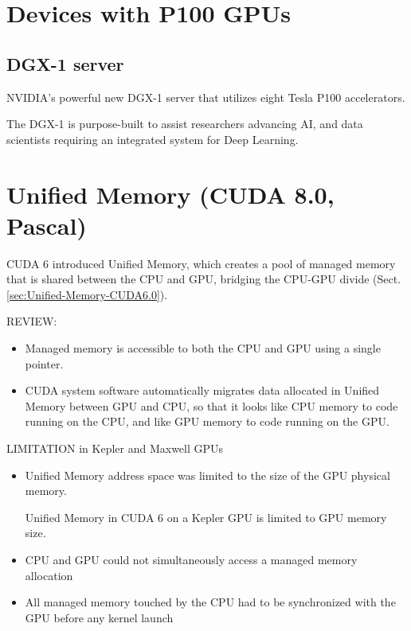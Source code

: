 \section{Devices with P100 GPUs}

\subsection{DGX-1 server}

NVIDIA’s powerful new DGX-1 server that utilizes eight Tesla P100 accelerators.

The DGX-1 is purpose-built to assist researchers advancing AI, and data
scientists requiring an integrated system for Deep Learning.



\section{Unified Memory (CUDA 8.0, Pascal)}
\label{sec:Unified-Memory-CUDA8.0}

CUDA 6 introduced Unified Memory, which creates a pool of managed memory that is
shared between the CPU and GPU, bridging the CPU-GPU divide (Sect.\ref{sec:Unified-Memory-CUDA6.0}).

REVIEW:
\begin{itemize}
  \item Managed memory is accessible to both the CPU and GPU using a single pointer. 
    
  \item  CUDA system software automatically migrates data allocated in Unified
Memory between GPU and CPU, so that it looks like CPU memory to code running on
the CPU, and like GPU memory to code running on the GPU.

\end{itemize}

LIMITATION in Kepler and Maxwell GPUs
\begin{itemize}

  \item Unified Memory address space was limited to the size of the GPU physical memory.
  
 Unified Memory in CUDA 6 on a Kepler GPU is limited to GPU memory size.
  
  \item CPU and GPU could not simultaneously access a managed memory allocation
  
  \item  All managed memory touched by the CPU had to be synchronized with the GPU before any kernel launch
  
\end{itemize}
 
